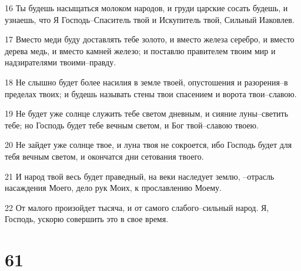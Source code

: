 \par 16 Ты будешь насыщаться молоком народов, и груди царские сосать будешь, и узнаешь, что Я Господь--Спаситель твой и Искупитель твой, Сильный Иаковлев.
\par 17 Вместо меди буду доставлять тебе золото, и вместо железа серебро, и вместо дерева медь, и вместо камней железо; и поставлю правителем твоим мир и надзирателями твоими--правду.
\par 18 Не слышно будет более насилия в земле твоей, опустошения и разорения--в пределах твоих; и будешь называть стены твои спасением и ворота твои--славою.
\par 19 Не будет уже солнце служить тебе светом дневным, и сияние луны--светить тебе; но Господь будет тебе вечным светом, и Бог твой--славою твоею.
\par 20 Не зайдет уже солнце твое, и луна твоя не сокроется, ибо Господь будет для тебя вечным светом, и окончатся дни сетования твоего.
\par 21 И народ твой весь будет праведный, на веки наследует землю, --отрасль насаждения Моего, дело рук Моих, к прославлению Моему.
\par 22 От малого произойдет тысяча, и от самого слабого--сильный народ. Я, Господь, ускорю совершить это в свое время.

\chapter{61}

